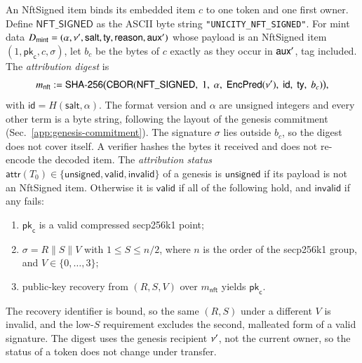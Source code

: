 An NftSigned item binds its embedded item $c$ to one token and one first owner. Define $\mathsf{NFT\_SIGNED}$ as the ASCII byte string \texttt{"UNICITY\_NFT\_SIGNED"}. For mint data $D_\mathsf{mint} = (\alpha, \nu', \mathsf{salt}, \mathsf{ty}, \mathsf{reason}, \mathsf{aux}')$ whose payload is an NftSigned item $(1, \mathsf{pk}_\mathsf{c}, c, \sigma)$, let $b_c$ be the bytes of $c$ exactly as they occur in $\mathsf{aux}'$, tag included. The \emph{attribution digest} is
\[
m_\mathsf{nft} := \mathsf{SHA\text{-}256}\bigl(\mathsf{CBOR}(
	\mathsf{NFT\_SIGNED},\;
	1,\;
	\alpha,\;
	\mathsf{EncPred}(\nu'),\;
	\mathsf{id},\;
	\mathsf{ty},\;
	b_c
)\bigr),
\]
with $\mathsf{id} = H(\mathsf{salt}, \alpha)$. The format version and $\alpha$ are unsigned integers and every other term is a byte string, following the layout of the genesis commitment (Sec.~\ref{app:genesis-commitment}). The signature $\sigma$ lies outside $b_c$, so the digest does not cover itself. A verifier hashes the bytes it received and does not re-encode the decoded item. The \emph{attribution status} $\mathsf{attr}(T_0) \in \{\mathsf{unsigned}, \mathsf{valid}, \mathsf{invalid}\}$ of a genesis is $\mathsf{unsigned}$ if its payload is not an NftSigned item. Otherwise it is $\mathsf{valid}$ if all of the following hold, and $\mathsf{invalid}$ if any fails:
\begin{enumerate}
	\item $\mathsf{pk}_\mathsf{c}$ is a valid compressed secp256k1 point;
	\item $\sigma = R \mathbin{\|} S \mathbin{\|} V$ with $1 \le S \le n/2$, where $n$ is the order of the secp256k1 group, and $V \in \{0, \ldots, 3\}$;
	\item public-key recovery from $(R, S, V)$ over $m_\mathsf{nft}$ yields $\mathsf{pk}_\mathsf{c}$.
\end{enumerate}
The recovery identifier is bound, so the same $(R, S)$ under a different $V$ is invalid, and the low-$S$ requirement excludes the second, malleated form of a valid signature. The digest uses the genesis recipient $\nu'$, not the current owner, so the status of a token does not change under transfer.

